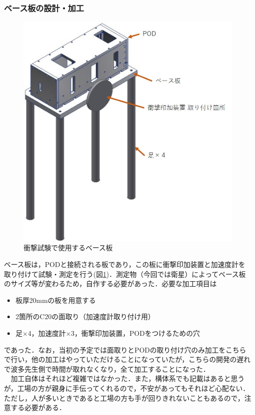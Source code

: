 \subsubsection{ベース板の設計・加工}
\begin{figure}[H]
	\centering
	\includegraphics[scale=0.5]{04/fig/impact_base_board.jpg}
	\caption{衝撃試験で使用するベース板}
	\label{fig4-4-2}
\end{figure}
ベース板は，PODと接続される板であり，この板に衝撃印加装置と加速度計を取り付けて試験・測定を行う(図\ref{fig4-4-2})．測定物（今回では衛星）によってベース板のサイズ等が変わるため，自作する必要があった．必要な加工項目は
\begin{itemize}
 \item 板厚20mmの板を用意する
 \item 2箇所のC20の面取り（加速度計取り付け用）
 \item 足×4，加速度計×3，衝撃印加装置，PODをつけるための穴
\end{itemize}
であった．なお，当初の予定では面取りとPODの取り付け穴のみ加工をこちらで行い，他の加工はやっていただけることになっていたが，こちらの開発の遅れで波多先生側で時間が取れなくなり，全て加工することになった．\\
　加工自体はそれほど複雑ではなかった．また，構体系でも記載はあると思うが，工場の方が親身に手伝ってくれるので，不安があってもそれほど心配ない．ただし，人が多いときであると工場の方も手が回りきれないこともあるので，注意する必要がある．
